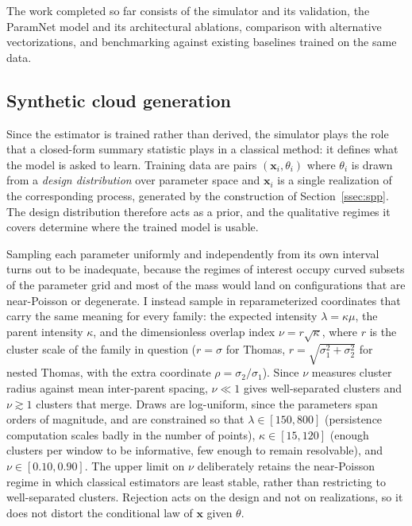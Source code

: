 \documentclass[11pt,a4paper]{article}
\newcommand{\pc}{\mathbf{x}}
\begin{document}
The work completed so far consists of the simulator and its validation, the
ParamNet model and its architectural ablations, comparison with alternative
vectorizations, and benchmarking against existing baselines trained on the same
data.

\subsection{Synthetic cloud generation}
\label{ssec:simulator}

Since the estimator is trained rather than derived, the simulator plays the role
that a closed-form summary statistic plays in a classical method: it defines
what the model is asked to learn. Training data are pairs $(\pc_i, \theta_i)$
where $\theta_i$ is drawn from a \emph{design distribution} over parameter space
and $\pc_i$ is a single realization of the corresponding process, generated by
the construction of Section~\ref{ssec:spp}. The design distribution therefore
acts as a prior, and the qualitative regimes it covers determine where the
trained model is usable.

Sampling each parameter uniformly and independently from its own interval turns
out to be inadequate, because the regimes of interest occupy curved subsets of
the parameter grid and most of the mass would land on configurations that are
near-Poisson or degenerate. I instead sample in reparameterized coordinates that
carry the same meaning for every family: the expected intensity
$\lambda = \kappa\mu$, the parent intensity $\kappa$, and the dimensionless
overlap index $\nu = r\sqrt{\kappa}$, where $r$ is the cluster scale of the
family in question ($r=\sigma$ for Thomas, $r=\sqrt{\sigma_1^2+\sigma_2^2}$ for
nested Thomas, with the extra coordinate $\rho = \sigma_2/\sigma_1$). Since
$\nu$ measures cluster radius against mean inter-parent spacing, $\nu \ll 1$
gives well-separated clusters and $\nu \gtrsim 1$ clusters that merge. Draws are
log-uniform, since the parameters span orders of magnitude, and are constrained
so that $\lambda \in [150,800]$ (persistence computation scales badly in the
number of points), $\kappa \in [15,120]$ (enough clusters per window to be
informative, few enough to remain resolvable), and $\nu \in [0.10,0.90]$. The
upper limit on $\nu$ deliberately retains the near-Poisson regime in which
classical estimators are least stable, rather than restricting to
well-separated clusters. Rejection acts on the design and not on realizations,
so it does not distort the conditional law of $\pc$ given $\theta$.
\end{document}
